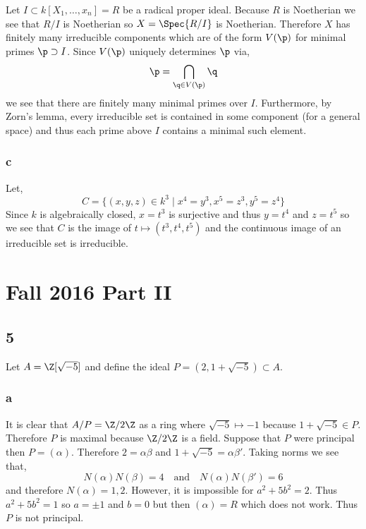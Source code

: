 \documentclass[12pt]{article}
\begin{document}
Let $I \subset k[X_1, \dots, x_n] = R$ be a radical proper ideal. Because $R$ is Noetherian we see that $R/I$ is Noetherian so $X = \Spec{R/I}$ is Noetherian. Therefore $X$ has finitely many irreducible components which are of the form $V(\p)$ for minimal primes $\p \supset I$. Since $V(\p)$ uniquely determines $\p$ via,
\[ \p = \bigcap_{\q \in V(\p)} \q \]
we see that there are finitely many minimal primes over $I$. Furthermore, by Zorn's lemma, every irreducible set is contained in some component (for a general space) and thus each prime above $I$ contains a minimal such element.

\subsubsection{c}

Let, 
\[ C = \{ (x,y,z) \in k^3 \mid x^4 = y^3, x^5 = z^3, y^5 = z^4 \} \]
Since $k$ is algebraically closed, $x = t^3$ is surjective and thus $y = t^4$ and $z = t^5$ so we see that $C$ is the image of $t \mapsto (t^3, t^4, t^5)$ and the continuous image of an irreducible set is irreducible.

\section{Fall 2016 Part II}


\subsection{5}

Let $A = \Z[\sqrt{-5}]$ and define the ideal $P = (2, 1 + \sqrt{-5}) \subset A$. 

\subsubsection{a}

It is clear that $A / P = \Z / 2 \Z$ as a ring where $\sqrt{-5} \mapsto -1$ because $1 + \sqrt{-5} \in P$. Therefore $P$ is maximal because $\Z / 2 \Z$ is a field. Suppose that $P$ were principal then $P = (\alpha)$. Therefore $2 = \alpha \beta$ and $1 + \sqrt{-5} = \alpha \beta'$. Taking norms we see that,
\[ N(\alpha) N(\beta) = 4 \quad \text{and} \quad N(\alpha) N(\beta') = 6 \]
and therefore $N(\alpha) = 1,2$. However, it is impossible for $a^2 + 5 b^2 = 2$. Thus $a^2 + 5 b^2 = 1$ so $a = \pm 1$ and $b = 0$ but then $(\alpha) = R$ which does not work. Thus $P$ is not principal.
\end{document}
